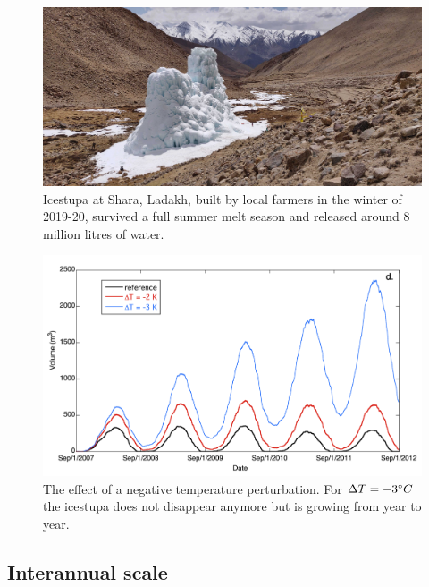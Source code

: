 
\begin{figure}[htb]
	\centering
	\includegraphics[width=\textwidth]{figs/PIR_example.jpg}

	\caption{Icestupa at Shara, Ladakh, built by local farmers in the winter of 2019-20, survived a full summer melt season and released
		around 8 million litres of water.}

	\label{fig:PIR}
\end{figure}

\begin{figure}[htb]
	\centering
	\includegraphics[width=\textwidth]{figs/PIR_evolution.png}
	\caption{The effect of a negative temperature perturbation. For $\Delta T = -3 ^{\circ} C$ the icestupa does
		not disappear anymore but is growing from year to year.}
	\label{fig:PIR_evolution}
\end{figure}



\subsection{Interannual scale}
\label{sec:interannual}

